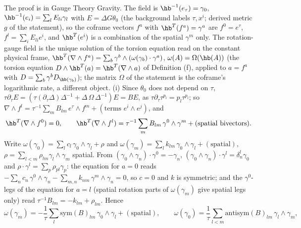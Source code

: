 The proof is in Gauge Theory Gravity. The field is $\hb^{-1}(e_{\tau}) = \gamma_{0}$, $\hb^{-1}(e_{i}) = \sum_{l}E_{li}\gamma_{l}$ with $E = \Delta G\theta_{0}$ (the background labels $\tau, x^{i}$; derived metric $g$ of the statement), so the coframe vectors $f^{a}$ with $\hb^{T}(f^{a}) = \gamma^{a}$ are $f^{0} = e^{\tau}$, $f^{l} = \sum_{i}E_{li}e^{i}$, and $\hb^{T}(e^{i})$ is a combination of the spatial $\gamma^{m}$ only. The rotation-gauge field is the unique solution of the torsion equation read on the constant physical frame, $\hb^{T}(\nabla \wedge f^{a}) = \sum_{b}\gamma^{b} \wedge (\omega(\gamma_{b}) \cdot \gamma^{a})$, $\omega(A) = \Omega(\hb(A))$ (the torsion equation $D \wedge \hb^{T}(a) = \hb^{T}(\nabla \wedge a)$ of Definition (f), applied to $a = f^{a}$ with $D = \sum_{b}\gamma^{b}D_{\hb(\gamma_{b})}$); the matrix $\Omega$ of the statement is the coframe's logarithmic rate, a different object. (i) Since $\theta_{0}$ does not depend on $\tau$, $\tau\partial_{\tau}E = (\tau(\partial_{\tau}\Delta)\Delta^{-1} + \Delta\,\Omega\,\Delta^{-1})E = BE$, as $\tau\partial_{\tau}\tau^{p_{l}} = p_{l}\tau^{p_{l}}$; so $\nabla \wedge f^{l} = \tau^{-1}\sum_{m}B_{lm}\,e^{\tau} \wedge f^{m} + (\text{terms } e^{i} \wedge e^{j})$, and
\[
\hb^{T}(\nabla \wedge f^{0}) = 0, \qquad \hb^{T}(\nabla \wedge f^{l}) = \tau^{-1}\sum_{m}B_{lm}\,\gamma^{0} \wedge \gamma^{m} + (\text{spatial bivectors}).
\]
Write $\omega(\gamma_{0}) = \sum_{l}c_{l}\,\gamma_{0} \wedge \gamma_{l} + \rho$ and $\omega(\gamma_{m}) = \sum_{l}k_{lm}\,\gamma_{0} \wedge \gamma_{l} + (\text{spatial})$, $\rho = \sum_{l<m}\rho_{lm}\gamma_{l} \wedge \gamma_{m}$ spatial. From $(\gamma_{0} \wedge \gamma_{n}) \cdot \gamma^{0} = -\gamma_{n}$, $(\gamma_{0} \wedge \gamma_{n}) \cdot \gamma^{l} = \delta^{l}_{n}\gamma_{0}$ and $\rho \cdot \gamma^{l} = \sum_{p}\rho_{pl}\gamma_{p}$: the equation for $a = 0$ reads $-\sum_{n}c_{n}\,\gamma^{0} \wedge \gamma_{n} - \sum_{m,n}k_{nm}\,\gamma^{m} \wedge \gamma_{n} = 0$, so $c = 0$ and $k$ is symmetric; and the $\gamma^{0}$-legs of the equation for $a = l$ (spatial rotation parts of $\omega(\gamma_{m})$ give spatial legs only) read $\tau^{-1}B_{lm} = -k_{lm} + \rho_{lm}$. Hence
\[
\omega(\gamma_{m}) = -\frac{1}{\tau}\sum_{l}\mathrm{sym}(B)_{lm}\,\gamma_{0} \wedge \gamma_{l} + (\text{spatial}), \qquad \omega(\gamma_{0}) = \frac{1}{\tau}\sum_{l<m}\mathrm{antisym}(B)_{lm}\,\gamma_{l} \wedge \gamma_{m},
\]
